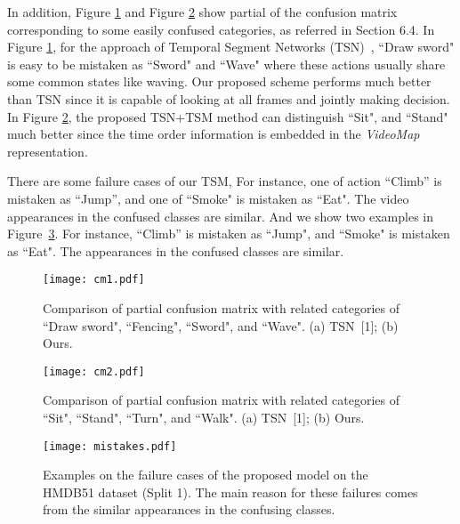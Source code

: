 \documentclass[english, 10pt, twocolumn, twoside]{IEEEtran}
\begin{document}
In addition, Figure \ref{fig:cm1} and Figure \ref{fig:cm2} show partial of the confusion matrix corresponding to some easily confused categories, as referred in Section 6.4. In Figure \ref{fig:cm1}, for the approach of Temporal Segment Networks (TSN)~\cite{wang2016temporal}, ``Draw sword" is easy to be mistaken as ``Sword" and ``Wave" where these actions usually share some common states like waving. Our proposed scheme performs much better than TSN since it is capable of looking at all frames and jointly making decision. In Figure \ref{fig:cm2}, the proposed TSN+TSM method can distinguish ``Sit", and ``Stand" much better since the time order information is embedded in the \emph{VideoMap} representation.

There are some failure cases of our TSM, For instance, one of action ``Climb'' is mistaken as ``Jump'', and one of ``Smoke" is mistaken as ``Eat". The video appearances in the confused classes are similar. And we show two examples in Figure~\ref{fig:TSM-mistakes}. For instance, ``Climb'' is mistaken as ``Jump", and ``Smoke" is mistaken as ``Eat". The appearances in the confused classes are similar.

\begin{figure}[t]
	\begin{center}
		\texttt{[image: cm1.pdf]}
	\end{center}
	\vspace{-0.1in}
	\caption{Comparison of partial confusion matrix with related categories of ``Draw sword", ``Fencing", ``Sword", and ``Wave". (a) TSN~[1]; (b) Ours.}
	\label{fig:cm1}
\end{figure}
\begin{figure}[t]
	\begin{center}
		\texttt{[image: cm2.pdf]}
	\end{center}
	\vspace{-0.1in}
	\caption{Comparison of partial confusion matrix with related categories of ``Sit", ``Stand", ``Turn", and ``Walk". (a) TSN~[1]; (b) Ours.}
	\label{fig:cm2}
\end{figure}
\begin{figure}[h]
 \vspace{0.1mm}
 \begin{center}
\texttt{[image: mistakes.pdf]}
\caption{Examples on the failure cases of the proposed model on the HMDB51 dataset (Split 1). The main reason for these failures comes from the similar appearances in the confusing classes.}
 \label{fig:TSM-mistakes}
   \end{center}
\end{figure}
\end{document}
